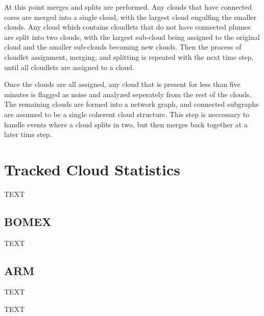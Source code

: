 \documentclass[acp]{copernicus}
\begin{document}
At this point merges and splits are performed.  Any clouds that have connected 
cores are merged into a single cloud, with the largest cloud engulfing the 
smaller clouds.  Any cloud which contains cloudlets that do not have connected
plumes are split into two clouds, with the largest sub-cloud being assigned to 
the original cloud and the smaller sub-clouds becoming new clouds.  Then the 
process of cloudlet assignment, merging, and splitting is repeated with the 
next time step, until all cloudlets are assigned to a cloud.

Once the clouds are all assigned, any cloud that is present for less than 
five minutes is flagged as noise and analyzed seperately from the rest of 
the clouds.  The remaining clouds are formed into a network graph, and 
connected subgraphs are assumed to be a single coherent cloud structure.  This 
step is neccessary to handle events where a cloud splits in two, but then 
merges back together at a later time step.


\section{Tracked Cloud Statistics}
TEXT

\subsection{BOMEX}
TEXT

\subsection{ARM}
TEXT


\conclusions
TEXT





\end{document}

